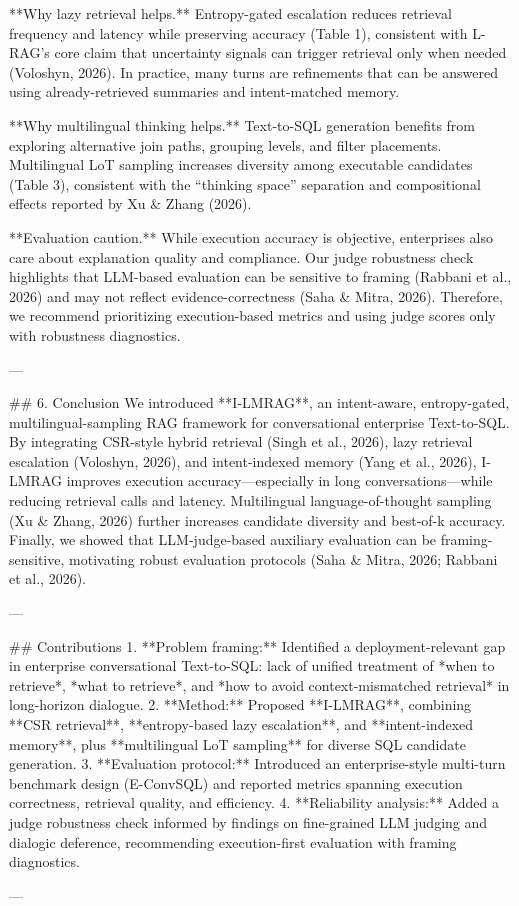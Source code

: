 **Why lazy retrieval helps.** Entropy-gated escalation reduces retrieval frequency and latency while preserving accuracy (Table 1), consistent with L-RAG’s core claim that uncertainty signals can trigger retrieval only when needed (Voloshyn, 2026). In practice, many turns are refinements that can be answered using already-retrieved summaries and intent-matched memory.

**Why multilingual thinking helps.** Text-to-SQL generation benefits from exploring alternative join paths, grouping levels, and filter placements. Multilingual LoT sampling increases diversity among executable candidates (Table 3), consistent with the “thinking space” separation and compositional effects reported by Xu & Zhang (2026).

**Evaluation caution.** While execution accuracy is objective, enterprises also care about explanation quality and compliance. Our judge robustness check highlights that LLM-based evaluation can be sensitive to framing (Rabbani et al., 2026) and may not reflect evidence-correctness (Saha & Mitra, 2026). Therefore, we recommend prioritizing execution-based metrics and using judge scores only with robustness diagnostics.

---

## 6. Conclusion  
We introduced **I-LMRAG**, an intent-aware, entropy-gated, multilingual-sampling RAG framework for conversational enterprise Text-to-SQL. By integrating CSR-style hybrid retrieval (Singh et al., 2026), lazy retrieval escalation (Voloshyn, 2026), and intent-indexed memory (Yang et al., 2026), I-LMRAG improves execution accuracy—especially in long conversations—while reducing retrieval calls and latency. Multilingual language-of-thought sampling (Xu & Zhang, 2026) further increases candidate diversity and best-of-k accuracy. Finally, we showed that LLM-judge-based auxiliary evaluation can be framing-sensitive, motivating robust evaluation protocols (Saha & Mitra, 2026; Rabbani et al., 2026).

---

## Contributions  
1. **Problem framing:** Identified a deployment-relevant gap in enterprise conversational Text-to-SQL: lack of unified treatment of *when to retrieve*, *what to retrieve*, and *how to avoid context-mismatched retrieval* in long-horizon dialogue.  
2. **Method:** Proposed **I-LMRAG**, combining **CSR retrieval**, **entropy-based lazy escalation**, and **intent-indexed memory**, plus **multilingual LoT sampling** for diverse SQL candidate generation.  
3. **Evaluation protocol:** Introduced an enterprise-style multi-turn benchmark design (E-ConvSQL) and reported metrics spanning execution correctness, retrieval quality, and efficiency.  
4. **Reliability analysis:** Added a judge robustness check informed by findings on fine-grained LLM judging and dialogic deference, recommending execution-first evaluation with framing diagnostics.

---